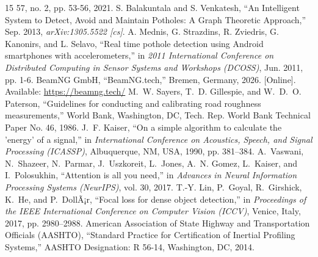 \documentclass[conference]{IEEEtran}
\begin{document}
\begin{thebibliography}{15}
57, no. 2, pp. 53-56, 2021.
 S. Balakuntala and S. Venkatesh, ``An Intelligent System to Detect, Avoid and Maintain Potholes: A Graph Theoretic Approach,'' Sep. 2013, \textit{arXiv:1305.5522 [cs]}.
 A. Mednis, G. Strazdins, R. Zviedris, G. Kanonirs, and L. Selavo, ``Real time pothole detection using Android smartphones with accelerometers,'' in \textit{2011 International Conference on Distributed Computing in Sensor Systems and Workshops (DCOSS)}, Jun. 2011, pp. 1-6.
 BeamNG GmbH, ``BeamNG.tech,'' Bremen, Germany, 2026. [Online]. Available: \url{https://beamng.tech/}
M.~W. Sayers, T.~D. Gillespie, and W.~D.~O.
Paterson, ``Guidelines for conducting and calibrating road roughness measurements,'' World Bank, Washington, DC, Tech.
Rep. World Bank Technical Paper No. 46, 1986.
J.~F. Kaiser, ``On a simple algorithm to calculate the 'energy' of a signal,'' in \textit{International Conference on Acoustics, Speech, and Signal Processing (ICASSP)}, Albuquerque, NM, USA, 1990, pp. 381--384.
A.~Vaswani, N.~Shazeer, N.~Parmar, J.~Uszkoreit, L.~Jones, A.~N. Gomez, L.~Kaiser, and I.~Polosukhin, ``Attention is all you need,'' in \textit{Advances in Neural Information Processing Systems (NeurIPS)}, vol.
30, 2017.
T.-Y. Lin, P.~Goyal, R.~Girshick, K.~He, and P.~DollÃ¡r, ``Focal loss for dense object detection,'' in \textit{Proceedings of the IEEE International Conference on Computer Vision (ICCV)}, Venice, Italy, 2017, pp. 2980--2988.
American Association of State Highway and Transportation Officials (AASHTO), ``Standard Practice for Certification of Inertial Profiling Systems,'' AASHTO Designation: R 56-14, Washington, DC, 2014.
\end{thebibliography}
\end{document}
